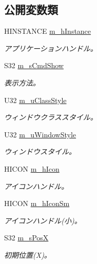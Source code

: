 \subsection*{公開変数類}
\begin{DoxyCompactItemize}
\item 
H\+I\+N\+S\+T\+A\+N\+C\+E \hyperlink{struct_c_win_base_1_1_st_init_param_a15dca12752feb05e1ddf14d6fc3d00a2}{m\+\_\+h\+Instance}
\begin{DoxyCompactList}\small\item\em アプリケーションハンドル。 \end{DoxyCompactList}\item 
S32 \hyperlink{struct_c_win_base_1_1_st_init_param_ad7ba6c400f9028868909656571ea9c36}{m\+\_\+s\+Cmd\+Show}
\begin{DoxyCompactList}\small\item\em 表示方法。 \end{DoxyCompactList}\item 
U32 \hyperlink{struct_c_win_base_1_1_st_init_param_a852e62af211b4fdadcb9e00b4097a9d7}{m\+\_\+u\+Class\+Style}
\begin{DoxyCompactList}\small\item\em ウィンドウクラススタイル。 \end{DoxyCompactList}\item 
U32 \hyperlink{struct_c_win_base_1_1_st_init_param_a75626930e6ea598f595af0bc37f9eba7}{m\+\_\+u\+Window\+Style}
\begin{DoxyCompactList}\small\item\em ウィンドウスタイル。 \end{DoxyCompactList}\item 
H\+I\+C\+O\+N \hyperlink{struct_c_win_base_1_1_st_init_param_a826817e2502febdfa8ed12a9513ff7ad}{m\+\_\+h\+Icon}
\begin{DoxyCompactList}\small\item\em アイコンハンドル。 \end{DoxyCompactList}\item 
H\+I\+C\+O\+N \hyperlink{struct_c_win_base_1_1_st_init_param_a362e7312d20f9ac6e38ceadbafb3d808}{m\+\_\+h\+Icon\+Sm}
\begin{DoxyCompactList}\small\item\em アイコンハンドル(小)。 \end{DoxyCompactList}\item 
S32 \hyperlink{struct_c_win_base_1_1_st_init_param_ae7c015279b95c1a6b70e77cafd810c35}{m\+\_\+s\+Pos\+X}
\begin{DoxyCompactList}\small\item\em 初期位置(\+X)。 \end{DoxyCompactList}\item 

\end{DoxyCompactItemize}
